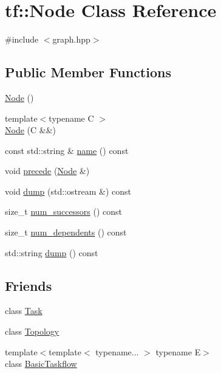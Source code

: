 \hypertarget{classtf_1_1Node}{}\section{tf\+:\+:Node Class Reference}
\label{classtf_1_1Node}


{\ttfamily \#include $<$graph.\+hpp$>$}

\subsection*{Public Member Functions}
\begin{DoxyCompactItemize}
\item 
\hyperlink{classtf_1_1Node_a6b1092cf320099a755253a6272d71e66}{Node} ()
\item 
{\footnotesize template$<$typename C $>$ }\\\hyperlink{classtf_1_1Node_ac4f83d80151907262972711fdfdcb177}{Node} (C \&\&)
\item 
const std\+::string \& \hyperlink{classtf_1_1Node_a0214bc98366d4c24a1cae941cdffe119}{name} () const
\item 
void \hyperlink{classtf_1_1Node_a753839c8159372098e7f48158229865c}{precede} (\hyperlink{classtf_1_1Node}{Node} \&)
\item 
void \hyperlink{classtf_1_1Node_a5b52f4d47173b28917d7361ea8af06d3}{dump} (std\+::ostream \&) const
\item 
size\+\_\+t \hyperlink{classtf_1_1Node_a7133911e093d82e5f5edd73124b60c6a}{num\+\_\+successors} () const
\item 
size\+\_\+t \hyperlink{classtf_1_1Node_abbb6a85cc8f62682ce8c78ad9851c0e5}{num\+\_\+dependents} () const
\item 
std\+::string \hyperlink{classtf_1_1Node_a0e398a8d70354ff11619bf5e603cbeb7}{dump} () const
\end{DoxyCompactItemize}
\subsection*{Friends}
\begin{DoxyCompactItemize}
\item 
class \hyperlink{classtf_1_1Node_aaa7728226b6ce66782e8816b1658dd9a}{Task}
\item 
class \hyperlink{classtf_1_1Node_acd2b8699ab7559c0da687cd775e2c778}{Topology}
\item 
{\footnotesize template$<$template$<$ typename... $>$ typename E$>$ }\\class \hyperlink{classtf_1_1Node_ab3ad8c5c7ed22c3fbd8a41b84db75083}{Basic\+Taskflow}
\end{DoxyCompactItemize}


